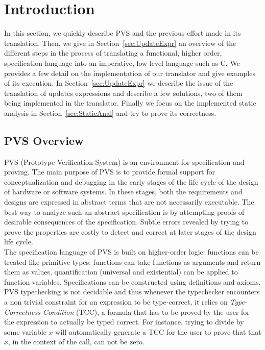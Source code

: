 \documentclass[12pt,a4paper]{article}
\begin{document}
\newpage
\tableofcontents
\newpage

\section{Introduction}


In this section, we quickly describe PVS and the previous effort made in its translation. Then, we give in Section~\ref{sec:UpdateExpr} an overview of the different steps in the process of translating a functional, higher order, specification language into an imperative, low-level language such as C. We provides a few detail on the implementation of our translator and give examples of its execution. In Section~\ref{sec:UpdateExpr} we describe the issue of the translation of updates expressions and describe a few solutions, two of them being implemented in the translator. Finally we focus on the implemented static analysis in Section~\ref{sec:StaticAnal} and try to prove its correctness.



\subsection{PVS Overview}

PVS  (Prototype Verification System) is an environment for specification and proving. The main purpose of PVS is to provide formal support for conceptualization and debugging in the early stages of the life cycle of the design of hardware or software systems. In these stages, both the requirements and designs are expressed in abstract terms that are not necessarily executable. The best way to analyze such an abstract specification is by attempting proofs of desirable consequences of the specification. Subtle errors revealed by trying to prove the properties are costly to detect and correct at later stages of the design life cycle. \\

The specification language of PVS is built on higher-order logic: functions can be treated like primitive types: functions can take functions as arguments and return them as values, quantification (universal and existential) can be applied to function variables. Specifications can be constructed using definitions and axioms. \\

PVS typechecking is not decidable and thus whenever the typechecker encounters a non trivial constraint for an expression to be type-correct, it relies on \emph{Type-Correctness Condition} (TCC), a formula that has to be proved by the user for the expression to actually be typed correct. For instance, trying to divide by some variable $x$ will automatically generate a TCC for the user to prove that that $x$, in the context of the call, can not be zero. \\
\end{document}
